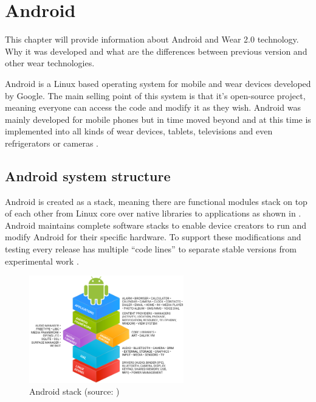\chapter{Android}\label{sec:Android}
This chapter will provide information about Android and Wear 2.0 technology. Why it was developed and what are the differences between previous version and other wear technologies.

\medskip

Android is a Linux based operating system for mobile and wear devices developed by Google. The main selling point of this system is that it's open-source project, meaning everyone can access the code and modify it as they wish. Android was mainly developed for mobile phones but in time moved beyond and at this time is implemented into all kinds of wear devices, tablets, televisions and even refrigerators or cameras \cite{WIGA}.

\section{Android system structure}\label{sec:AndroidSystemStructure}
Android is created as a stack, meaning there are functional modules stack on top of each other from Linux core over native libraries to applications as shown in . Android maintains complete software stacks to enable device creators to run and modify Android for their specific hardware. To support these modifications and testing every release has multiple \enquote{code lines} to separate stable versions from experimental work \cite{AOSP}.

\begin{figure}[H]
	\begin{centering}
		\includegraphics[width=0.6\textwidth]{img/android_stack}
		\par\end{centering}
	\caption{Android stack (source: \cite{AOSP})\label{fig:AndroidStack}}
	\label{fig01c04}
\end{figure}

